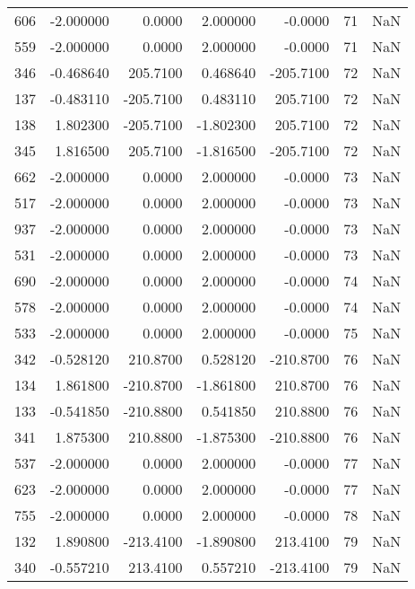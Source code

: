 \begin{tabular}{rrrrrrr}
 606 &   -2.000000 &    0.0000 &    2.000000 &     -0.0000 &          71 & NaN \\
 559 &   -2.000000 &    0.0000 &    2.000000 &     -0.0000 &          71 & NaN \\
 346 &   -0.468640 &  205.7100 &    0.468640 &   -205.7100 &          72 & NaN \\
 137 &   -0.483110 & -205.7100 &    0.483110 &    205.7100 &          72 & NaN \\
 138 &    1.802300 & -205.7100 &   -1.802300 &    205.7100 &          72 & NaN \\
 345 &    1.816500 &  205.7100 &   -1.816500 &   -205.7100 &          72 & NaN \\
 662 &   -2.000000 &    0.0000 &    2.000000 &     -0.0000 &          73 & NaN \\
 517 &   -2.000000 &    0.0000 &    2.000000 &     -0.0000 &          73 & NaN \\
 937 &   -2.000000 &    0.0000 &    2.000000 &     -0.0000 &          73 & NaN \\
 531 &   -2.000000 &    0.0000 &    2.000000 &     -0.0000 &          73 & NaN \\
 690 &   -2.000000 &    0.0000 &    2.000000 &     -0.0000 &          74 & NaN \\
 578 &   -2.000000 &    0.0000 &    2.000000 &     -0.0000 &          74 & NaN \\
 533 &   -2.000000 &    0.0000 &    2.000000 &     -0.0000 &          75 & NaN \\
 342 &   -0.528120 &  210.8700 &    0.528120 &   -210.8700 &          76 & NaN \\
 134 &    1.861800 & -210.8700 &   -1.861800 &    210.8700 &          76 & NaN \\
 133 &   -0.541850 & -210.8800 &    0.541850 &    210.8800 &          76 & NaN \\
 341 &    1.875300 &  210.8800 &   -1.875300 &   -210.8800 &          76 & NaN \\
 537 &   -2.000000 &    0.0000 &    2.000000 &     -0.0000 &          77 & NaN \\
 623 &   -2.000000 &    0.0000 &    2.000000 &     -0.0000 &          77 & NaN \\
 755 &   -2.000000 &    0.0000 &    2.000000 &     -0.0000 &          78 & NaN \\
 132 &    1.890800 & -213.4100 &   -1.890800 &    213.4100 &          79 & NaN \\
 340 &   -0.557210 &  213.4100 &    0.557210 &   -213.4100 &          79 & NaN \\

\end{tabular}
